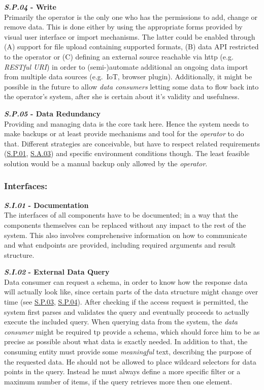 \documentclass[12pt,english,a4paper,titlepage,cleardoublepage=empty,dottedtoc]{report}
\begin{document}
\textbf{\emph{\protect\hypertarget{sp04}{}{S.P.04}} - Write}\\
Primarily the operator is the only one who has the permissions to add,
change or remove data. This is done either by using the appropriate
forms provided by visual user interface or import mechanisms. The latter
could be enabled through (A) support for file upload containing
supported formats, (B) data API restricted to the operator or (C)
defining an external source reachable via http (e.g. \emph{RESTful URI})
in order to (semi-)automate additional an ongoing data import from
multiple data sources (e.g.~IoT, browser plugin). Additionally, it might
be possible in the future to allow \emph{data consumers} letting some
data to flow back into the operator's system, after she is certain about
it's validity and usefulness.

\textbf{\emph{\protect\hypertarget{sp05}{}{S.P.05}} - Data Redundancy}\\
Providing and managing data is the core task here. Hence the system
needs to make backups or at least provide mechanisms and tool for the
\emph{operator} to do that. Different strategies are conceivable, but
have to respect related requirements (\protect\hyperlink{sp01}{S.P.01},
\protect\hyperlink{sa03}{S.A.03}) and specific environment conditions
though. The least feasible solution would be a manual backup only
allowed by the \emph{operator}.

\subsubsection{Interfaces:}\label{interfaces}

\textbf{\emph{\protect\hypertarget{si01}{}{S.I.01}} - Documentation}\\
The interfaces of all components have to be documented; in a way that
the components themselves can be replaced without any impact to the rest
of the system. This also involves comprehensive information on how to
communicate and what endpoints are provided, including required
arguments and result structure.

\textbf{\emph{\protect\hypertarget{si02}{}{S.I.02}} - External Data
Query}\\
Data consumer can request a schema, in order to know how the response
data will actually look like, since certain parts of the data structure
might change over time (see \protect\hyperlink{sp03}{S.P.03},
\protect\hyperlink{sp04}{S.P.04}). After checking if the access request
is permitted, the system first parses and validates the query and
eventually proceeds to actually execute the included query. When
querying data from the system, the \emph{data consumer} might be
required tp provide a schema, which should force him to be as precise as
possible about what data is exactly needed. In addition to that, the
consuming entity must provide some \emph{meaningful} text, describing
the purpose of the requested data. He should not be allowed to place
wildcard selectors for data points in the query. Instead he must always
define a more specific filter or a maximum number of items, if the query
retrieves more then one element.
\end{document}
